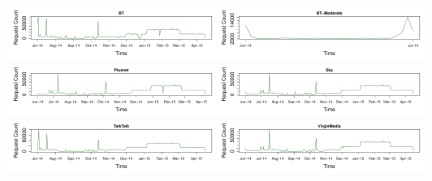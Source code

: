 \documentclass{bmcart}
\begin{document}

\begin{figure}[h!]
\caption{}
\includegraphics[width=0.49\textwidth]{imgs/BT-ts-requests.pdf}\includegraphics[width=0.49\textwidth]{imgs/BT-Moderate-ts-requests.pdf}
\includegraphics[width=0.49\textwidth]{imgs/Plusnet-ts-requests.pdf}\includegraphics[width=0.49\textwidth]{imgs/Sky-ts-requests.pdf}
\includegraphics[width=0.49\textwidth]{imgs/TalkTalk-ts-requests.pdf}\includegraphics[width=0.49\textwidth]{imgs/VirginMedia-ts-requests.pdf}
\label{fig:broadband-requests}
\end{figure}
\end{document}
